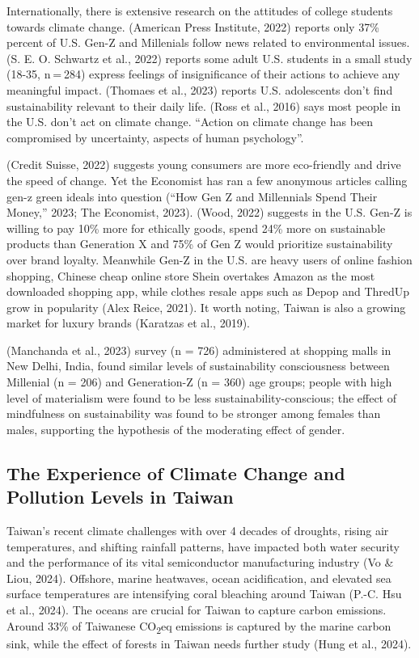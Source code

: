 \documentclass[
  12pt,
  letterpaper,
  DIV=11,
  numbers=noendperiod]{scrartcl}
\begin{document}
Internationally, there is extensive research on the attitudes of college
students towards climate change. (American Press Institute, 2022)
reports only 37\% percent of U.S. Gen-Z and Millenials follow news
related to environmental issues. (S. E. O. Schwartz et al., 2022)
reports some adult U.S. students in a small study (18-35, n = 284)
express feelings of insignificance of their actions to achieve any
meaningful impact. (Thomaes et al., 2023) reports U.S. adolescents don't
find sustainability relevant to their daily life. (Ross et al., 2016)
says most people in the U.S. don't act on climate change. ``Action on
climate change has been compromised by uncertainty, aspects of human
psychology''.

(Credit Suisse, 2022) suggests young consumers are more eco-friendly and
drive the speed of change. Yet the Economist has ran a few anonymous
articles calling gen-z green ideals into question ({``How {Gen Z} and
Millennials Spend Their Money,''} 2023; The Economist, 2023). (Wood,
2022) suggests in the U.S. Gen-Z is willing to pay 10\% more for
ethically goods, spend 24\% more on sustainable products than Generation
X and 75\% of Gen Z would prioritize sustainability over brand loyalty.
Meanwhile Gen-Z in the U.S. are heavy users of online fashion shopping,
Chinese cheap online store Shein overtakes Amazon as the most downloaded
shopping app, while clothes resale apps such as Depop and ThredUp grow
in popularity (Alex Reice, 2021). It worth noting, Taiwan is also a
growing market for luxury brands (Karatzas et al., 2019).

(Manchanda et al., 2023) survey (n = 726) administered at shopping malls
in New Delhi, India, found similar levels of sustainability
consciousness between Millenial (n = 206) and Generation-Z (n = 360) age
groups; people with high level of materialism were found to be less
sustainability-conscious; the effect of mindfulness on sustainability
was found to be stronger among females than males, supporting the
hypothesis of the moderating effect of gender.

\subsection{The Experience of Climate Change and Pollution Levels in
Taiwan}\label{the-experience-of-climate-change-and-pollution-levels-in-taiwan}

Taiwan's recent climate challenges with over 4 decades of droughts,
rising air temperatures, and shifting rainfall patterns, have impacted
both water security and the performance of its vital semiconductor
manufacturing industry \hspace{0pt}(Vo \& Liou, 2024). Offshore, marine
heatwaves, ocean acidification, and elevated sea surface temperatures
are intensifying coral bleaching around Taiwan (P.-C. Hsu et al., 2024).
The oceans are crucial for Taiwan to capture carbon emissions. Around
33\% of Taiwanese CO\textsubscript{2}eq emissions is captured by the
marine carbon sink, while the effect of forests in Taiwan needs further
study (Hung et al., 2024).
\end{document}
